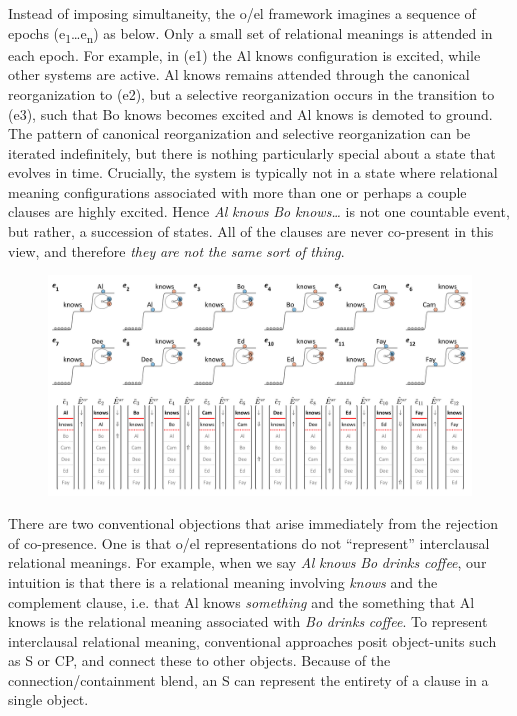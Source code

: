   Instead of imposing simultaneity, the o/el framework imagines a sequence of epochs (e\textsubscript{1}…e\textsubscript{n}) as below. Only a small set of relational meanings is attended in each epoch. For example, in (e1) the {\textbar}Al knows{\textbar} configuration is excited, while other systems are active. {\textbar}Al knows{\textbar} remains attended through the canonical reorganization to (e2),  but a selective reorganization occurs in the transition to (e3), such that {\textbar}Bo knows{\textbar} becomes excited and {\textbar}Al knows{\textbar} is demoted to ground. The pattern of canonical reorganization and selective reorganization can be iterated indefinitely, but there is nothing particularly special about a state that evolves in time. Crucially, the system is typically not in a state where relational meaning configurations associated with more than one or perhaps a couple clauses are highly excited. Hence \textit{Al} \textit{knows} \textit{Bo} \textit{knows…} is not one countable event, but rather, a succession of states. All of the clauses are never co-present in this view, and therefore \textit{they} \textit{are} \textit{not} \textit{the} \textit{same} \textit{sort} \textit{of} \textit{thing}.

  
\begin{figure}
\includegraphics[width=\textwidth]{figures/Tilsen-img106.png}
\caption{\missingcaption}
\label{fig:}
\end{figure}
 

  There are two conventional objections that arise immediately from the rejection of co-presence. One is that o/el representations do not “represent” interclausal relational meanings. For example, when we say \textit{Al} \textit{knows} \textit{Bo} \textit{drinks} \textit{coffee}, our intuition is that there is a relational meaning involving \textit{knows} and the complement clause, i.e. that Al knows \textit{something} and the something that Al knows is the relational meaning associated with \textit{Bo} \textit{drinks} \textit{coffee}. To represent interclausal relational meaning, conventional approaches posit object-units such as S or CP, and connect these to other objects. Because of the connection/containment blend, an S can represent the entirety of a clause in a single object. 

